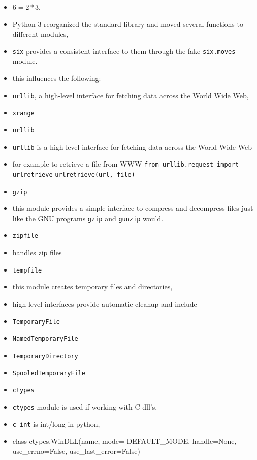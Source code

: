 \documentclass[onecolumn]{IEEEtran} %
\begin{document}
\begin{itemize}
        \item $6=2*3$,
        \item Python 3 reorganized the standard library and moved several functions to different modules,
        \bi
            \item \verb|six| provides a consistent interface to them through the fake \verb|six.moves| module.
        \ei
        \item this influences the following:
        \bi
            \item \verb|urllib|, a high-level interface for fetching data across the World Wide Web,
            \item \verb|xrange|
        \ei
    \ei
    \item \verb|urllib|
    \bi
        \item  \verb|urllib| is a high-level interface for fetching data across the World Wide Web
        \item for example to retrieve a file from WWW \newline
        \verb|from urllib.request import urlretrieve| \newline
        \verb|urlretrieve(url, file)|
    \ei
    \item \verb|gzip|
    \bi
        \item this module provides a simple interface to compress and decompress files just like the GNU programs \verb|gzip| and \verb|gunzip| would.
    \ei
    \item \verb|zipfile|
    \bi
        \item handles zip files
    \ei
    \item \verb|tempfile|
    \bi
        \item this module creates temporary files and directories,
        \item high level interfaces provide automatic cleanup and include
        \bi
            \item \verb|TemporaryFile|
            \item \verb|NamedTemporaryFile|
            \item \verb|TemporaryDirectory|
            \item \verb|SpooledTemporaryFile|
        \ei
    \ei
    \item \verb|ctypes|
    \bi
        \item \verb|ctypes| module is used if working with C dll’s,
        \item \verb|c_int| is int/long in python,
        \item class ctypes.WinDLL(name, mode= DEFAULT\_MODE, handle=None, use\_errno=False, use\_last\_error=False)

\end{itemize}
\end{document}
